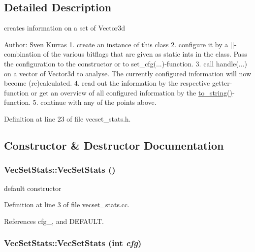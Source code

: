 \subsection{Detailed Description}
creates information on a set of Vector3d 

\begin{Desc}
\item[Author:]Sven Kurras 1. create an instance of this class 2. configure it by a $|$$|$-combination of the various bitflags that are given as static ints in the class. Pass the configuration to the constructor or to set\_\-cfg(...)-function. 3. call handle(...) on a vector of Vector3d to analyse. The currently configured information will now become (re)calculated. 4. read out the information by the respective getter-function or get an overview of all configured information by the \hyperlink{class_vec_set_stats_1618681fee0ab61e61243be352a4cee5}{to\_\-string()}-function. 5. continue with any of the points above. \end{Desc}


Definition at line 23 of file vecset\_\-stats.h.

\subsection{Constructor \& Destructor Documentation}
\hypertarget{class_vec_set_stats_c4f1f328da6ba34452e433c6d28b313a}{
\subsubsection[VecSetStats]{\setlength{\rightskip}{0pt plus 5cm}VecSetStats::VecSetStats ()}}
\label{class_vec_set_stats_c4f1f328da6ba34452e433c6d28b313a}


default constructor 

Definition at line 3 of file vecset\_\-stats.cc.

References cfg\_\-, and DEFAULT.\hypertarget{class_vec_set_stats_15b02682930db0edc827dfcdcfbfcf69}{
\subsubsection[VecSetStats]{\setlength{\rightskip}{0pt plus 5cm}VecSetStats::VecSetStats (int {\em cfg})}}
\label{class_vec_set_stats_15b02682930db0edc827dfcdcfbfcf69}



